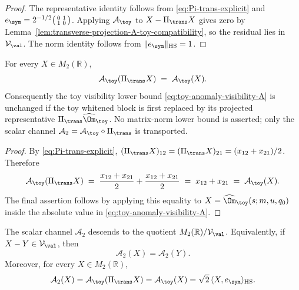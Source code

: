 \begin{proof}
The representative identity follows from
\eqref{eq:Pi-trans-explicit} and
\(e_\sym=2^{-1/2}\bigl(\begin{smallmatrix}0&1\\1&0\end{smallmatrix}\bigr)\).
Applying \(\mathcal A_\toy\) to \(X-\Pi_\trans X\) gives zero by
Lemma~\ref{lem:transverse-projection-A-toy-compatibility}, so the
residual lies in \(\mathcal V_\val\).  The norm identity follows from
\(\|e_\sym\|_{\mathrm{HS}}=1\).
\end{proof}

\begin{lemma}
\label{lem:transverse-projection-A-toy-compatibility}
For every \(X\in M_2(\mathbb R)\),
\begin{equation}
\label{eq:A-toy-pi-compat}
        \mathcal A_\toy(\Pi_\trans X)\;=\;\mathcal A_\toy(X).
\end{equation}
Consequently the toy visibility lower bound
\eqref{eq:toy-anomaly-visibility-A} is unchanged if the toy whitened
block is first replaced by its projected representative
\(\Pi_\trans\widehat\Om_\toy\).  No matrix-norm lower bound is
asserted; only the scalar channel
\(\mathcal A_2=\mathcal A_\toy\circ\Pi_\trans\) is transported.
\end{lemma}

\begin{proof}
By \eqref{eq:Pi-trans-explicit},
\((\Pi_\trans X)_{12}=(\Pi_\trans X)_{21}=(x_{12}+x_{21})/2\).
Therefore
\[
        \mathcal A_\toy(\Pi_\trans X)
        \;=\;\frac{x_{12}+x_{21}}{2}+\frac{x_{12}+x_{21}}{2}
        \;=\;x_{12}+x_{21}
        \;=\;\mathcal A_\toy(X).
\]
The final assertion follows by applying this equality to
\(X=\widehat\Om_\toy(s;m,u,q_0)\) inside the absolute value in
\eqref{eq:toy-anomaly-visibility-A}.
\end{proof}

\begin{lemma}
\label{lem:A2-quotient-well-defined}
The scalar channel \(\mathcal A_2\) descends to the quotient
\(M_2(\mathbb R)/\mathcal V_\val\).  Equivalently, if
\(X-Y\in\mathcal V_\val\), then
\begin{equation}
\label{eq:A2-quotient-well-defined}
        \mathcal A_2(X)=\mathcal A_2(Y).
\end{equation}
Moreover, for every \(X\in M_2(\mathbb R)\),
\begin{equation}
\label{eq:A2-representative-identities}
        \mathcal A_2(X)
        =\mathcal A_\toy(\Pi_\trans X)
        =\mathcal A_\toy(X)
        =\sqrt2\,\langle X,e_\sym\rangle_{\mathrm{HS}}.
\end{equation}
\end{lemma}

